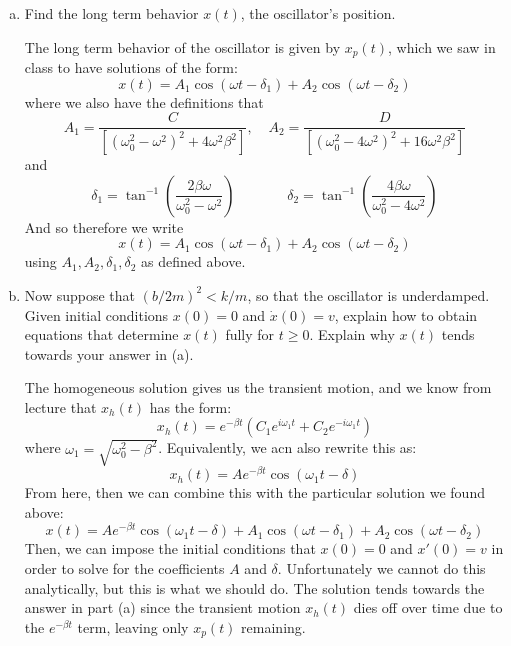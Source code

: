 \documentclass[10pt]{article}
\begin{document}
    \begin{enumerate}[(a)]
        \item Find the long term behavior $x(t)$, the oscillator's position.

        \begin{solution}
            The long term behavior of the oscillator is given by $x_p(t)$, which we saw in class to have solutions of the form: 
            \[ x(t) = A_1 \cos(\omega t - \delta_1) + A_2\cos(\omega t - \delta_2)\]
            where we also have the definitions that 
            \[ A_1 = \frac{C}{\left[ (\omega_0^2 - \omega^2)^2 + 4\omega^2 \beta^2\right]}, \phantom{aa} A_2 = \frac{D}{\left[(\omega_0^2 - 4\omega^2)^2 + 16\omega^2 \beta^2\right]}\] 
            and 
            \[ \delta_1 = \tan^{-1}\left( \frac{2\beta \omega}{\omega_0^2 - \omega^2}\right) \phantom{aaaaaaa} \delta_2 = \tan^{-1} \left( \frac{4\beta \omega}{\omega_0^2 - 4\omega^2}\right)\] 
            And so therefore we write
            \[ x(t) = A_1 \cos(\omega t - \delta_1) + A_2 \cos (\omega t - \delta_2)\] 
            using $A_1, A_2, \delta_1, \delta_2$ as defined above. 
        \end{solution}
        \item Now suppose that $(b/2m)^2 < k/m$, so that the oscillator is underdamped. Given initial conditions $x(0) = 0$ and $\dot x(0) = v$, explain how to obtain equations that determine $x(t)$ fully for $t \ge 0$. Explain why $x(t)$ tends towards your answer in (a).
        
        \begin{solution}
            The homogeneous solution gives us the transient motion, and we know from lecture that $x_h(t)$ has the form: 
            \[ x_h(t) = e^{-\beta t}\left( C_1 e^{i\omega_1t} + C_2 e^{-i\omega_1t}\right)\] 
            where $\omega_1 = \sqrt{\omega_0^2 - \beta^2}$. Equivalently, we acn also rewrite this as: 
            \[ x_h(t) = Ae^{-\beta t} \cos(\omega_1t - \delta)\] 
            From here, then we can combine this with the particular solution we found above: 
            \[ x(t) = Ae^{-\beta t} \cos(\omega_1t - \delta) + A_1 \cos(\omega t - \delta _1) + A_2\cos(\omega t - \delta_2)\]
            Then, we can impose the initial conditions that $x(0) = 0$ and $x'(0) = v$ in order to solve for the coefficients $A$ and $\delta$. Unfortunately we cannot do this analytically, but this is what we should do. The solution tends towards the answer in part (a) since the transient motion $x_h(t)$ dies off over time due to the $e^{-\beta t}$ term, leaving only $x_p(t)$ remaining.
        \end{solution}
    \end{enumerate}
\end{document}
